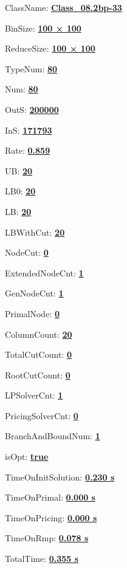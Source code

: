 \documentclass[11pt]{article}
\begin{document}
\pagestyle{empty}


ClassName: \underline{\textbf{Class_08.2bp-33}}
\par
BinSize: \underline{\textbf{100 × 100}}
\par
ReduceSize: \underline{\textbf{100 × 100}}
\par
TypeNum: \underline{\textbf{80}}
\par
Num: \underline{\textbf{80}}
\par
OutS: \underline{\textbf{200000}}
\par
InS: \underline{\textbf{171793}}
\par
Rate: \underline{\textbf{0.859}}
\par
UB: \underline{\textbf{20}}
\par
LB0: \underline{\textbf{20}}
\par
LB: \underline{\textbf{20}}
\par
LBWithCut: \underline{\textbf{20}}
\par
NodeCut: \underline{\textbf{0}}
\par
ExtendedNodeCnt: \underline{\textbf{1}}
\par
GenNodeCnt: \underline{\textbf{1}}
\par
PrimalNode: \underline{\textbf{0}}
\par
ColumnCount: \underline{\textbf{20}}
\par
TotalCutCount: \underline{\textbf{0}}
\par
RootCutCount: \underline{\textbf{0}}
\par
LPSolverCnt: \underline{\textbf{1}}
\par
PricingSolverCnt: \underline{\textbf{0}}
\par
BranchAndBoundNum: \underline{\textbf{1}}
\par
isOpt: \underline{\textbf{true}}
\par
TimeOnInitSolution: \underline{\textbf{0.230 s}}
\par
TimeOnPrimal: \underline{\textbf{0.000 s}}
\par
TimeOnPricing: \underline{\textbf{0.000 s}}
\par
TimeOnRmp: \underline{\textbf{0.078 s}}
\par
TotalTime: \underline{\textbf{0.355 s}}
\par
\newpage


\end{document}
